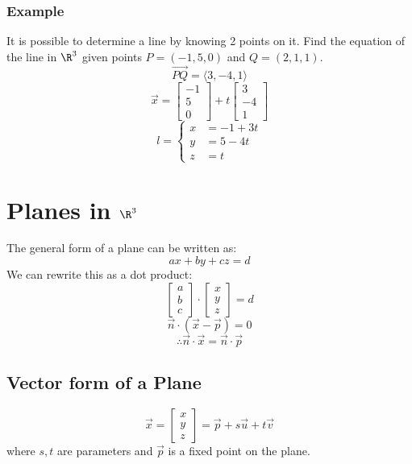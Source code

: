 \documentclass{math}
\begin{document}
\subsubsection*{Example}
It is possible to determine a line by knowing 2 points on it. Find the equation
of the line in \( \R^3 \) given points \( P = (-1,5,0) \) and \( Q = (2,1,1) \).
\[ \overrightarrow{PQ} = \langle3,-4,1\rangle \]
\[ \vec{x} = \begin{bmatrix}-1 \\ 5 \\ 0\end{bmatrix}+
  t\begin{bmatrix}3 \\ -4 \\ 1\end{bmatrix} \]
\[ l = \begin{cases}
  x &= -1+3t \\
  y &= 5-4t \\
  z &= t
\end{cases} \]

\section*{Planes in \( \R^3 \)}
The general form of a plane can be written as:
\[ ax+by+cz = d \]
We can rewrite this as a dot product:
\[ \begin{bmatrix}a \\ b \\ c\end{bmatrix}\cdot
  \begin{bmatrix}x \\ y \\ z\end{bmatrix} = d \]
\[ \vec{n}\cdot(\vec{x}-\vec{p}) = 0 \]
\[ \therefore \vec{n}\cdot\vec{x} = \vec{n}\cdot\vec{p} \]

\subsection*{Vector form of a Plane}
\[ \vec{x} = \begin{bmatrix}x \\ y \\ z\end{bmatrix} =
  \vec{p}+s\vec{u}+t\vec{v} \]
where \( s,t \) are parameters and \( \vec{p} \) is a fixed point on the plane.
\end{document}
